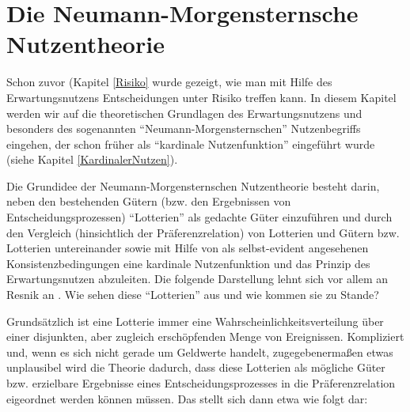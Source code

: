 \section{Die Neumann-Morgensternsche Nutzentheorie}
\label{NeumannMorgenstern}
Schon zuvor (Kapitel \ref{Risiko} wurde gezeigt, wie man mit Hilfe des
Erwartungsnutzens Entscheidungen unter Risiko treffen kann. In diesem Kapitel
werden wir auf die theoretischen Grundlagen des Erwartungsnutzens und besonders
des sogenannten "`Neumann-Morgensternschen"' Nutzenbegriffs eingehen, der schon
früher als "`kardinale Nutzenfunktion"' eingeführt wurde (siehe Kapitel
\ref{KardinalerNutzen}).

Die Grundidee der Neumann-Morgensternschen Nutzentheorie besteht darin, neben
den bestehenden Gütern (bzw. den Ergebnissen von Ent\-schei\-dungs\-pro\-zessen)
"`Lotterien"' als gedachte Güter einzuführen und durch den Vergleich (hinsichtlich
der Präferenzrelation) von Lotterien und Gütern bzw. Lotterien untereinander
sowie mit Hilfe von als selbst-evident angesehenen Konsistenzbedingungen eine
kardinale Nutzenfunktion und das Prinzip des
Erwartungsnutzen abzuleiten.  Die folgende Darstellung lehnt sich vor allem
an Resnik an \cite[S. 88-98]{resnik:1987}. Wie sehen diese "`Lotterien"'
aus und wie kommen sie zu Stande?

Grundsätzlich ist eine Lotterie immer eine Wahrscheinlichkeitsverteilung über
einer disjunkten, aber zugleich erschöpfenden Menge von Ereignissen.
Kompliziert und, wenn es sich nicht gerade um Geldwerte handelt,
zugegebenermaßen etwas unplausibel wird die Theorie dadurch, dass diese
Lotterien als mögliche Güter bzw. erzielbare Ergebnisse eines
Entscheidungsprozesses in die Präferenzrelation eigeordnet werden können
müssen. Das stellt sich dann etwa wie folgt dar:

